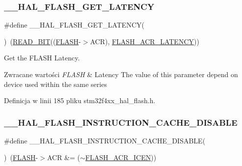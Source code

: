 \subsubsection{\texorpdfstring{\+\_\+\+\_\+\+H\+A\+L\+\_\+\+F\+L\+A\+S\+H\+\_\+\+G\+E\+T\+\_\+\+L\+A\+T\+E\+N\+CY}{\_\_HAL\_FLASH\_GET\_LATENCY}}
{\footnotesize\ttfamily \#define \+\_\+\+\_\+\+H\+A\+L\+\_\+\+F\+L\+A\+S\+H\+\_\+\+G\+E\+T\+\_\+\+L\+A\+T\+E\+N\+CY(\begin{DoxyParamCaption}{ }\end{DoxyParamCaption})~(\hyperlink{group___exported__macro_ga822bb1bb9710d5f2fa6396b84e583c33}{R\+E\+A\+D\+\_\+\+B\+IT}((\hyperlink{group___peripheral__declaration_ga844ea28ba1e0a5a0e497f16b61ea306b}{F\+L\+A\+SH}-\/$>$A\+CR), \hyperlink{group___peripheral___registers___bits___definition_gaef5e44cbb084160a6004ca9951ec7318}{F\+L\+A\+S\+H\+\_\+\+A\+C\+R\+\_\+\+L\+A\+T\+E\+N\+CY}))}



Get the F\+L\+A\+SH Latency. 


\begin{DoxyRetVals}{Zwracane wartości}
{\em F\+L\+A\+SH} & Latency The value of this parameter depend on device used within the same series \\
\hline
\end{DoxyRetVals}


Definicja w linii 185 pliku stm32f4xx\+\_\+hal\+\_\+flash.\+h.

\mbox{\label{group___f_l_a_s_h___exported___macros_ga01bf00ed6e7c0e74ed0931f3b8b033ed}} 
\subsubsection{\texorpdfstring{\+\_\+\+\_\+\+H\+A\+L\+\_\+\+F\+L\+A\+S\+H\+\_\+\+I\+N\+S\+T\+R\+U\+C\+T\+I\+O\+N\+\_\+\+C\+A\+C\+H\+E\+\_\+\+D\+I\+S\+A\+B\+LE}{\_\_HAL\_FLASH\_INSTRUCTION\_CACHE\_DISABLE}}
{\footnotesize\ttfamily \#define \+\_\+\+\_\+\+H\+A\+L\+\_\+\+F\+L\+A\+S\+H\+\_\+\+I\+N\+S\+T\+R\+U\+C\+T\+I\+O\+N\+\_\+\+C\+A\+C\+H\+E\+\_\+\+D\+I\+S\+A\+B\+LE(\begin{DoxyParamCaption}{ }\end{DoxyParamCaption})~(\hyperlink{group___peripheral__declaration_ga844ea28ba1e0a5a0e497f16b61ea306b}{F\+L\+A\+SH}-\/$>$A\+CR \&= ($\sim$\hyperlink{group___peripheral___registers___bits___definition_ga51d8b1dd2c46942d377c579a38dce711}{F\+L\+A\+S\+H\+\_\+\+A\+C\+R\+\_\+\+I\+C\+EN}))}



